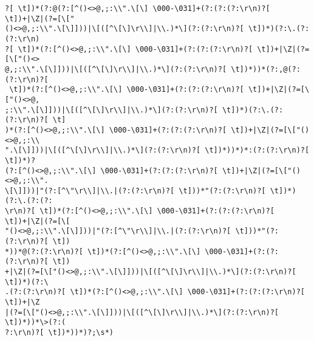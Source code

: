 \documentclass[14pt]{beamer}
\begin{document}
\begin{frame}[fragile]
\begin{lstlisting}
?[ \t])*(?:@(?:[^()<>@,;:\\".\[\] \000-\031]+(?:(?:(?:\r\n)?[ \t])+|\Z|(?=[\["
()<>@,;:\\".\[\]]))|\[([^\[\]\r\\]|\\.)*\](?:(?:\r\n)?[ \t])*)(?:\.(?:(?:\r\n)
?[ \t])*(?:[^()<>@,;:\\".\[\] \000-\031]+(?:(?:(?:\r\n)?[ \t])+|\Z|(?=[\["()<>
@,;:\\".\[\]]))|\[([^\[\]\r\\]|\\.)*\](?:(?:\r\n)?[ \t])*))*(?:,@(?:(?:\r\n)?[
 \t])*(?:[^()<>@,;:\\".\[\] \000-\031]+(?:(?:(?:\r\n)?[ \t])+|\Z|(?=[\["()<>@,
;:\\".\[\]]))|\[([^\[\]\r\\]|\\.)*\](?:(?:\r\n)?[ \t])*)(?:\.(?:(?:\r\n)?[ \t]
)*(?:[^()<>@,;:\\".\[\] \000-\031]+(?:(?:(?:\r\n)?[ \t])+|\Z|(?=[\["()<>@,;:\\
".\[\]]))|\[([^\[\]\r\\]|\\.)*\](?:(?:\r\n)?[ \t])*))*)*:(?:(?:\r\n)?[ \t])*)?
(?:[^()<>@,;:\\".\[\] \000-\031]+(?:(?:(?:\r\n)?[ \t])+|\Z|(?=[\["()<>@,;:\\".
\[\]]))|"(?:[^\"\r\\]|\\.|(?:(?:\r\n)?[ \t]))*"(?:(?:\r\n)?[ \t])*)(?:\.(?:(?:
\r\n)?[ \t])*(?:[^()<>@,;:\\".\[\] \000-\031]+(?:(?:(?:\r\n)?[ \t])+|\Z|(?=[\[
"()<>@,;:\\".\[\]]))|"(?:[^\"\r\\]|\\.|(?:(?:\r\n)?[ \t]))*"(?:(?:\r\n)?[ \t])
*))*@(?:(?:\r\n)?[ \t])*(?:[^()<>@,;:\\".\[\] \000-\031]+(?:(?:(?:\r\n)?[ \t])
+|\Z|(?=[\["()<>@,;:\\".\[\]]))|\[([^\[\]\r\\]|\\.)*\](?:(?:\r\n)?[ \t])*)(?:\
.(?:(?:\r\n)?[ \t])*(?:[^()<>@,;:\\".\[\] \000-\031]+(?:(?:(?:\r\n)?[ \t])+|\Z
|(?=[\["()<>@,;:\\".\[\]]))|\[([^\[\]\r\\]|\\.)*\](?:(?:\r\n)?[ \t])*))*\>(?:(
?:\r\n)?[ \t])*))*)?;\s*)
    \end{lstlisting}
\end{frame}
\end{document}
